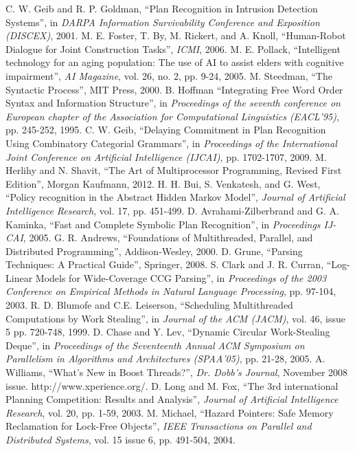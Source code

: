 \documentclass[12pt,twoside,abbrevs,msc,ai,notimes,logo,sansheadings]{infthesis}
\begin{document}
  \appendix


  \begin{thebibliography}{100}
   C. W. Geib and R. P. Goldman, ``Plan Recognition in Intrusion Detection Systems'', in \emph{DARPA Information Survivability Conference and Exposition (DISCEX)}, 2001.
   M. E. Foster, T. By, M. Rickert, and A. Knoll, ``Human-Robot Dialogue for Joint Construction Tasks'', \emph{ICMI}, 2006.
   M. E. Pollack, ``Intelligent technology for an aging population: The use of AI to assist elders with cognitive impairment'', \emph{AI Magazine}, vol. 26, no. 2, pp. 9-24, 2005.
   M. Steedman, ``The Syntactic Process'', MIT Press, 2000.
   B. Hoffman ``Integrating Free Word Order Syntax and Information Structure'', in \emph{Proceedings of the seventh conference on European chapter of the Association for Computational Linguistics (EACL'95)}, pp. 245-252, 1995.
   C. W. Geib, ``Delaying Commitment in Plan Recognition Using Combinatory Categorial Grammars'', in \emph{Proceedings of the International Joint Conference on Artificial Intelligence (IJCAI)}, pp. 1702-1707, 2009.
   M. Herlihy and N. Shavit, ``The Art of Multiprocessor Programming, Revised First Edition'', Morgan Kaufmann, 2012.
   H. H. Bui, S. Venkatesh, and G. West, ``Policy recognition in the Abstract Hidden Markov Model'', \emph{Journal of Artificial Intelligence Research}, vol. 17, pp. 451-499.
   D. Avrahami-Zilberbrand and G. A. Kaminka, ``Fast and Complete Symbolic Plan Recognition'', in \emph{Proceedings IJ-CAI}, 2005.
   G. R. Andrews, ``Foundations of Multithreaded, Parallel, and Distributed
Programming'', Addison-Wesley, 2000.
   D. Grune, ``Parsing Techniques: A Practical Guide'', Springer, 2008.
   S. Clark and J. R. Curran, ``Log-Linear Models for Wide-Coverage CCG Parsing'', in \emph{Proceedings of the 2003 Conference on Empirical Methods in Natural
Language Processing}, pp. 97-104, 2003.
  R. D. Blumofe and C.E. Leiserson, ``Scheduling Multithreaded Computations by Work Stealing'', in \emph{Journal of the ACM (JACM)}, vol. 46, issue 5 pp. 720-748, 1999.
  D. Chase and Y. Lev, ``Dynamic Circular Work-Stealing Deque'', in \emph{Proceedings of the Seventeenth Annual ACM Symposium on Parallelism in Algorithms and Architectures (SPAA'05)}, pp. 21-28, 2005.
  A. Williams, ``What's New in Boost Threads?'', \emph{Dr. Dobb's Journal}, November 2008 issue.
  http://www.xperience.org/.
  D. Long and M. Fox, ``The 3rd international Planning Competition: Results and Analysis'', \emph{Journal of Artificial Intelligence Research}, vol. 20, pp. 1-59, 2003.
  M. Michael, ``Hazard Pointers: Safe Memory Reclamation for Lock-Free Objects'', \emph{IEEE Transactions on Parallel and Distributed Systems}, vol. 15 issue 6, pp. 491-504, 2004.
  \end{thebibliography}
\end{document}

